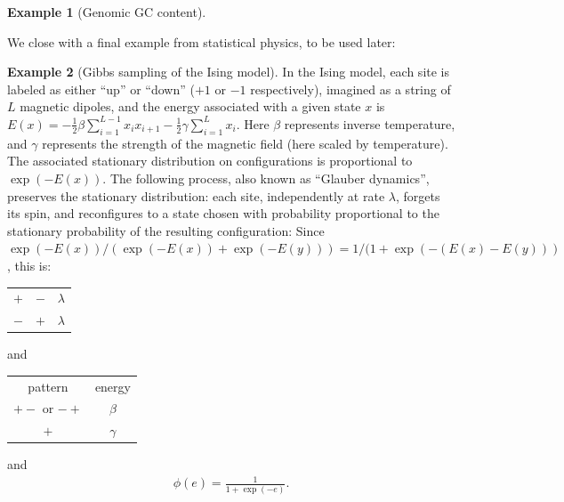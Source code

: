 \documentclass{article}
\theoremstyle{plain}
\theoremstyle{definition}
\newtheorem{example}{Example}[section]
\begin{document}
\begin{example}[Genomic GC content]
\end{example}

We close with a final example from statistical physics, to be used later:

\begin{example}[Gibbs sampling of the Ising model]
    In the Ising model, each site is labeled as either ``up'' or ``down'' ($+1$ or $-1$ respectively),
    imagined as a string of $L$ magnetic dipoles,
    and the energy associated with a given state $x$ is $E(x) = - \frac{1}{2} \beta \sum_{i=1}^{L-1} x_i x_{i+1} - \frac{1}{2} \gamma \sum_{i=1}^L x_i$.
    Here $\beta$ represents inverse temperature, and $\gamma$ represents the strength of the magnetic field (here scaled by temperature).
    The associated stationary distribution on configurations is proportional to $\exp(-E(x))$.
    The following process, also known as ``Glauber dynamics'', preserves the stationary distribution:
    each site, independently at rate $\lambda$,
    forgets its spin,
    and reconfigures to a state chosen with probability proportional to the stationary probability of the resulting configuration:
    Since $\exp(-E(x))/(\exp(-E(x))+\exp(-E(y))) = 1/(1+\exp(-(E(x)-E(y)))$,
    this is:
    \begin{center}
        \begin{tabular}{c@{\quad$\to$\quad}c@{\quad at rate\quad }c}
          $+$  &   $-$   &  $\lambda$ \\
          $-$  &   $+$   &  $\lambda$
        \end{tabular}
        \qquad and \qquad
        \begin{tabular}{cc}
        pattern  &  energy \\
        $+-$ or $-+$  &   $\beta$ \\
        $+$ &   $\gamma$
        \end{tabular}
    \end{center}
    and
    \begin{align*}
        \phi(e) = \frac{1}{1+\exp(-e)} .
    \end{align*}
\end{example}
\end{document}
